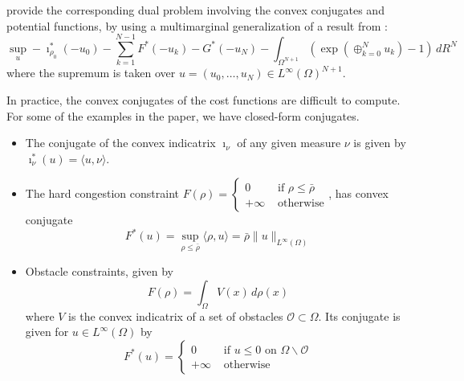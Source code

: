 \documentclass{article}
\begin{document}
    \textcite{benamou2018entropy} provide the corresponding dual problem involving the convex conjugates and potential functions, by using a multimarginal generalization of a result from \textcite{chizat2016scaling}:
    \begin{equation}\label{eq:TimeDiscreteDual}
    	\sup_u -\imath_{\rho_0}^*(-u_0) - \sum_{k=1}^{N-1} F^*(-u_k) - G^*(-u_N)
    	- \int_{\Omega^{N+1}} \left(\exp\left(\oplus_{k=0}^N u_k\right)-1\right) \,dR^N
    \end{equation}
    where the supremum is taken over $u = (u_0,\ldots,u_N) \in L^\infty(\Omega)^{N+1}$.
    
	\begin{remark}\label{rem:ConvexConj}
	In practice, the convex conjugates of the cost functions are difficult to compute. For some of the examples in the paper, we have closed-form conjugates.
	\begin{itemize}
		\item The conjugate of the convex indicatrix $\imath_{\nu}$ of any given measure $\nu$ is given by $\imath_{\nu}^*(u) = \langle u, \nu\rangle$.
		\item The hard congestion constraint $F(\rho) = \begin{cases}
		0&\text{ if }\rho\leq \bar{\rho} \\
		+\infty&\text{ otherwise}
		\end{cases}$, has convex conjugate
		\[
			F^*(u) = \sup_{\rho\leq \bar{\rho}}{} \langle \rho, u\rangle = \bar{\rho}\|u\|_{L^\infty(\Omega)}
		\]
		\item Obstacle constraints, given by
		\[
		F(\rho) = \int_\Omega V(x)\,d\rho(x) 
		\]
		where $V$ is the convex indicatrix of a set of obstacles $\mathscr{O} \subset \Omega$. Its conjugate is given for $u\in L^\infty(\Omega)$ by
		\[
		F^*(u) = \begin{cases}
		0& \text{ if } u \leq 0\text{ on }\Omega\backslash\mathscr{O} \\
		+\infty& \text{ otherwise}
		\end{cases}
		\]
	\end{itemize}
	\end{remark}
    
\end{document}
